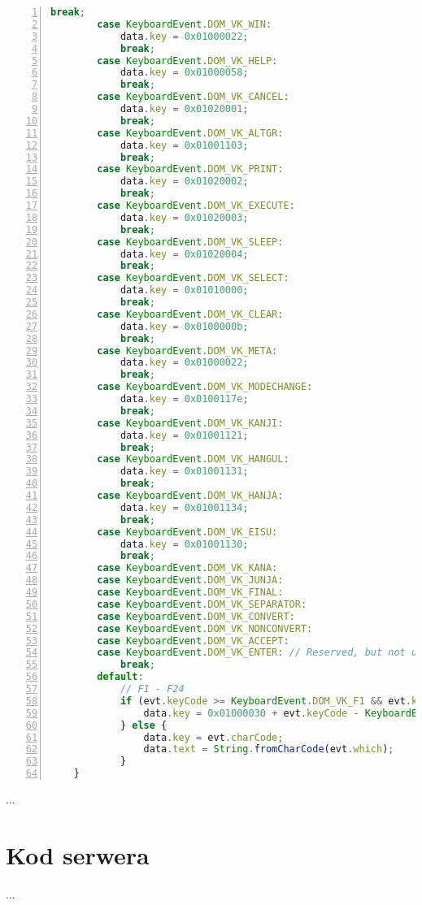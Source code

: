 \begin{lstlisting}[language=JavaScript,numbers=left,caption={Fragment metody translacji kodów klawiatury},label={lst:addons_keyboard_method}]
            break;
        case KeyboardEvent.DOM_VK_WIN:
            data.key = 0x01000022;
            break;
        case KeyboardEvent.DOM_VK_HELP:
            data.key = 0x01000058;
            break;
        case KeyboardEvent.DOM_VK_CANCEL:
            data.key = 0x01020001;
            break;
        case KeyboardEvent.DOM_VK_ALTGR:
            data.key = 0x01001103;
            break;
        case KeyboardEvent.DOM_VK_PRINT:
            data.key = 0x01020002;
            break;
        case KeyboardEvent.DOM_VK_EXECUTE:
            data.key = 0x01020003;
            break;
        case KeyboardEvent.DOM_VK_SLEEP:
            data.key = 0x01020004;
            break;
        case KeyboardEvent.DOM_VK_SELECT:
            data.key = 0x01010000;
            break;
        case KeyboardEvent.DOM_VK_CLEAR:
            data.key = 0x0100000b;
            break;
        case KeyboardEvent.DOM_VK_META:
            data.key = 0x01000022;
            break;
        case KeyboardEvent.DOM_VK_MODECHANGE:
            data.key = 0x0100117e;
            break;
        case KeyboardEvent.DOM_VK_KANJI:
            data.key = 0x01001121;
            break;
        case KeyboardEvent.DOM_VK_HANGUL:
            data.key = 0x01001131;
            break;
        case KeyboardEvent.DOM_VK_HANJA:
            data.key = 0x01001134;
            break;
        case KeyboardEvent.DOM_VK_EISU:
            data.key = 0x01001130;
            break;
        case KeyboardEvent.DOM_VK_KANA:
        case KeyboardEvent.DOM_VK_JUNJA:
        case KeyboardEvent.DOM_VK_FINAL:
        case KeyboardEvent.DOM_VK_SEPARATOR:
        case KeyboardEvent.DOM_VK_CONVERT:
        case KeyboardEvent.DOM_VK_NONCONVERT:
        case KeyboardEvent.DOM_VK_ACCEPT:
        case KeyboardEvent.DOM_VK_ENTER: // Reserved, but not used.
            break;
        default:
            // F1 - F24
            if (evt.keyCode >= KeyboardEvent.DOM_VK_F1 && evt.keyCode <= KeyboardEvent.DOM_VK_F24) {
                data.key = 0x01000030 + evt.keyCode - KeyboardEvent.DOM_VK_F1;
            } else {
                data.key = evt.charCode;
                data.text = String.fromCharCode(evt.which);
            }
    }
\end{lstlisting}
...

\section{Kod serwera}

...